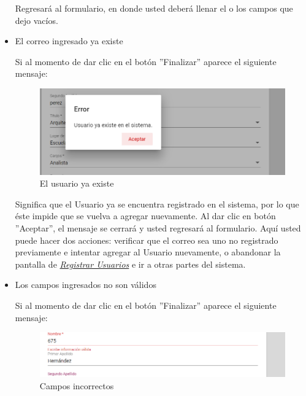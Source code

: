 \begin{itemize}
\begin{figure}[!hbtp]
                         \end{figure}

                            Regresará  al formulario, en donde usted deberá llenar el o los campos que dejo vacíos.
                          \item El correo ingresado ya existe

                        Si al momento de dar clic en el botón ''Finalizar'' aparece el siguiente mensaje:

                        \begin{figure}[!hbtp]
                        	\centering
                        	\includegraphics[width=0.4\linewidth]{images/SP5/MSG36}
                        	\caption{El usuario ya existe}
                        	\label{mensaje36}

                        \end{figure}

                        Significa que el Usuario ya se encuentra registrado en el sistema, por lo que éste impide que se vuelva a agregar nuevamente. Al dar clic en botón ''Aceptar'', el mensaje se cerrará y usted regresará al formulario. Aquí usted puede hacer dos acciones: verificar que el correo sea uno no registrado previamente e intentar agregar al Usuario nuevamente, o abandonar la pantalla de \hyperlink{registrarUs}{\textit{Registrar Usuarios}} e ir a otras partes del sistema.

                        \item Los campos ingresados no son válidos

                            Si al momento de dar clic en el botón ''Finalizar'' aparece el siguiente mensaje:
                            \clearpage
                                \begin{figure}[!hbtp]
                         	\centering
                         	\includegraphics[width=0.4\linewidth]{images/SP5/MSG35}
                         	\caption{Campos incorrectos}
                         	\label{mensaje35}


\end{figure}
\end{itemize}
